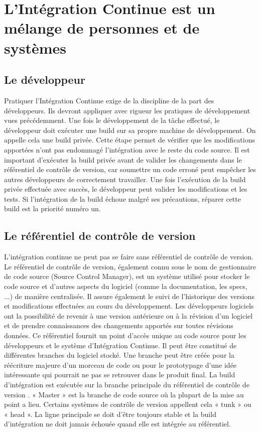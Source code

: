   \section{L’Intégration Continue est un mélange de personnes et de systèmes}

    \subsection{Le développeur}
    Pratiquer l’Intégration Continue exige de la discipline de la part des développeurs. Ils devront appliquer avec rigueur les pratiques de développement vues précédemment. Une fois le développement de la tâche effectué, le développeur doit exécuter une build sur sa propre machine de développement. On appelle cela une build privée. Cette étape permet de vérifier que les modifications apportées n’ont pas endommagé l'intégration avec le reste du code source. Il est important d'exécuter la build privée avant de valider les changements dans le référentiel de contrôle de version, car soumettre un code erroné peut empêcher les autres développeurs de correctement travailler. Une fois l’exécution de la build privée effectuée avec succès, le développeur peut valider les modifications et les tests. Si l'intégration de la build échoue malgré ses précautions, réparer cette build est la priorité numéro un.

    \subsection{Le référentiel de contrôle de version}\label{SCM}
    L'intégration continue ne peut pas se faire sans référentiel de contrôle de version. Le référentiel de contrôle de version, également connu sous le nom de gestionnaire de code source (Source Control Manager), est un système utilisé pour stocker le code source et d'autres aspects du logiciel (comme la documentation, les specs, ...) de manière centralisée. Il assure également le suivi de l'historique des versions et modifications effectuées au cours du développement. Les développeurs logiciels ont la possibilité de revenir à une version antérieure ou à la révision d'un logiciel et de prendre connaissances des changements apportés sur toutes révisions données. Ce référentiel fournit un point d'accès unique au code source pour les développeurs et le système d’Intégration Continue. Il peut être constitué de différentes branches du logiciel stocké. Une branche peut être créée pour la réécriture majeure d’un morceau de code ou pour le prototypage d’une idée intéressante qui pourrait ne pas se retrouver dans le produit final. La build d’intégration est exécutée sur la branche principale du référentiel de contrôle de version \cite{Duv07}. « Master » est la branche de code source où la plupart de la mise au point a lieu. Certains systèmes de contrôle de version appellent cela « tunk » ou « head ». La ligne principale se doit d’être toujours stable et la build d’intégration ne doit jamais échouée quand elle est intégrée au référentiel.

